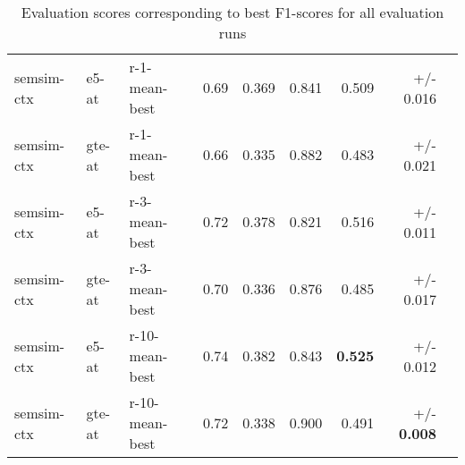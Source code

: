 \documentclass[11pt]{scrreprt}
\begin{document}
{\begin{table}[htp]
\begin{tabular}{lllrrrrrr}
\hline
semsim-ctx & e5-at & r-1-mean-best & 0.69 & 0.369 & 0.841 & 0.509 & +/- 0.016 \\
semsim-ctx & gte-at & r-1-mean-best & 0.66 & 0.335 & 0.882 & 0.483 & +/- 0.021 \\
semsim-ctx & e5-at & r-3-mean-best & 0.72 & 0.378 & 0.821 & 0.516 & +/- 0.011 \\
semsim-ctx & gte-at & r-3-mean-best & 0.70 & 0.336 & 0.876 & 0.485 & +/- 0.017 \\
semsim-ctx & e5-at & r-10-mean-best & 0.74 & 0.382 & 0.843 & \textbf{0.525} & +/- 0.012 \\
semsim-ctx & gte-at & r-10-mean-best & 0.72 & 0.338 & 0.900 & 0.491 & +/- \textbf{0.008} \\
\bottomrule
\end{tabular}
\caption{Evaluation scores corresponding to best F1-scores for all evaluation runs}
\label{tab:best-f1-score-mean-best}
\end{table}

}
\end{document}
